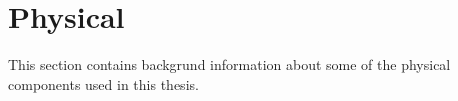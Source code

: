 \section{Physical}
\label{sec:tPhysical}
This section contains backgrund information about some of the physical components used in this thesis.


